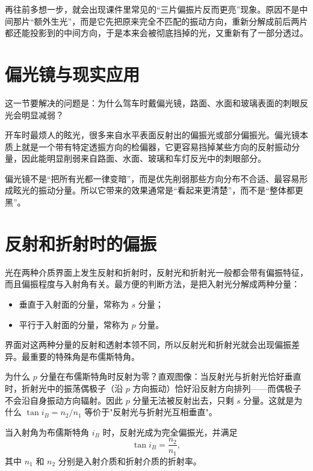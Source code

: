 \documentclass[lang=cn,11pt]{elegantbook}
\begin{document}
\begin{remark}
再往前多想一步，就会出现课件里常见的“三片偏振片反而更亮”现象。原因不是中间那片“额外生光”，而是它先把原来完全不匹配的振动方向，重新分解成前后两片都还能投影到的中间方向，于是本来会被彻底挡掉的光，又重新有了一部分透过。
\end{remark}

\section{偏光镜与现实应用}

这一节要解决的问题是：为什么驾车时戴偏光镜，路面、水面和玻璃表面的刺眼反光会明显减弱？

开车时最烦人的眩光，很多来自水平表面反射出的偏振光或部分偏振光。偏光镜本质上就是一个带有特定透振方向的检偏器，它更容易挡掉某些方向的反射振动分量，因此能明显削弱来自路面、水面、玻璃和车灯反光中的刺眼部分。

\begin{note}
偏光镜不是“把所有光都一律变暗”，而是优先削弱那些方向分布不合适、最容易形成眩光的振动分量。所以它带来的效果通常是“看起来更清楚”，而不是“整体都更黑”。
\end{note}

\section{反射和折射时的偏振}

光在两种介质界面上发生反射和折射时，反射光和折射光一般都会带有偏振特征，而且偏振程度与入射角有关。最方便的判断方法，是把入射光分解成两种分量：
\begin{itemize}
  \item 垂直于入射面的分量，常称为 \(s\) 分量；
  \item 平行于入射面的分量，常称为 \(p\) 分量。
\end{itemize}
界面对这两种分量的反射和透射本领不同，所以反射光和折射光就会出现偏振差异。最重要的特殊角是布儒斯特角。

\begin{remark}
为什么 \(p\) 分量在布儒斯特角时反射为零？直观图像：当反射光与折射光恰好垂直时，折射光中的振荡偶极子（沿 \(p\) 方向振动）恰好沿反射方向排列——而偶极子不会沿自身振动方向辐射。因此 \(p\) 分量无法被反射出去，只剩 \(s\) 分量。这就是为什么 \(\tan i_B=n_2/n_1\) 等价于"反射光与折射光互相垂直"。
\end{remark}

\begin{theorem}[布儒斯特定律]\label{thm:brewster-law}
当入射角为布儒斯特角 \(i_B\) 时，反射光成为完全偏振光，并满足
\[
\tan i_B=\frac{n_2}{n_1},
\]
其中 \(n_1\) 和 \(n_2\) 分别是入射介质和折射介质的折射率。
\end{theorem}
\end{document}
